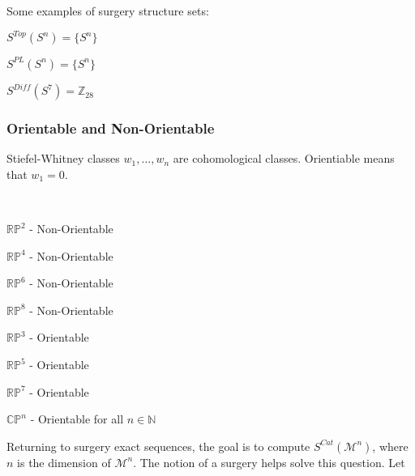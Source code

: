 \documentclass[crop=false,class=article,oneside]{standalone}
\begin{document}
        \begin{example}
            Some examples of surgery structure sets:
            \begin{enumerate}
                \begin{multicols}{3}
                    \item $S^{Top}(S^{n})=\{S^{n}\}$
                    \item $S^{PL}(S^{n})=\{S^{n}\}$
                    \item $S^{Diff}(S^{7})=\mathbb{Z}_{28}$
                \end{multicols}
            \end{enumerate}
        \end{example}
        \subsubsection{Orientable and Non-Orientable}
            Stiefel-Whitney classes $w_{1},\hdots, w_{n}$ are
            cohomological classes.
            Orientiable means that $w_{1}=0$.
            \begin{example}
                \
                \begin{enumerate}
                \end{enumerate}
            \end{example}
            Returning to surgery exact sequences, the goal
            is to compute $S^{Cat}(\mathcal{M}^{n})$, where $n$
            is the dimension of $\mathcal{M}^{n}$. The notion
            of a surgery helps solve this question. Let
\end{document}
